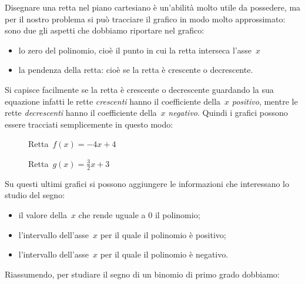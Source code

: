 Disegnare una retta nel piano cartesiano è un'abilità molto utile da
possedere, ma per il nostro problema si può tracciare il grafico in modo
molto approssimato: sono due gli aspetti che dobbiamo riportare nel grafico:

\begin{itemize} [noitemsep]
 \item
  lo zero del polinomio, cioè il punto in cui la retta interseca l'asse~$x$
 \item
  la pendenza della retta: cioè se la retta è crescente o decrescente.
\end{itemize}

Si capisce facilmente se la retta è crescente o decrescente guardando la sua
equazione infatti le rette \emph{crescenti} hanno il coefficiente della~$x$
\emph{positivo}, mentre le rette \emph{decrescenti} hanno il coefficiente
della~$x$ \emph{negativo}.
Quindi i grafici possono essere tracciati semplicemente in questo modo:

\begin{inaccessibleblock}
 \begin{figure}[h]
 \centering
 \begin{minipage}[]{.45\textwidth}
  \centering
  \caption{Retta~$f(x) = -4 x +4$}
 \end{minipage}
 \begin{minipage}[]{.45\textwidth}
  \centering
  \caption{Retta~$g(x) = \frac{3}{2} x +3$}
 \end{minipage}
\end{figure}
\end{inaccessibleblock}

Su questi ultimi grafici si possono aggiungere le informazioni che
interessano lo studio del segno:

\begin{itemize} [noitemsep]
 \item il valore della~$x$ che rende uguale a 0 il polinomio;
 \item l'intervallo dell'asse~$x$ per il quale il polinomio è positivo;
 \item l'intervallo dell'asse~$x$ per il quale il polinomio è negativo.
\end{itemize}

Riassumendo, per studiare il segno di un binomio di primo grado dobbiamo:

